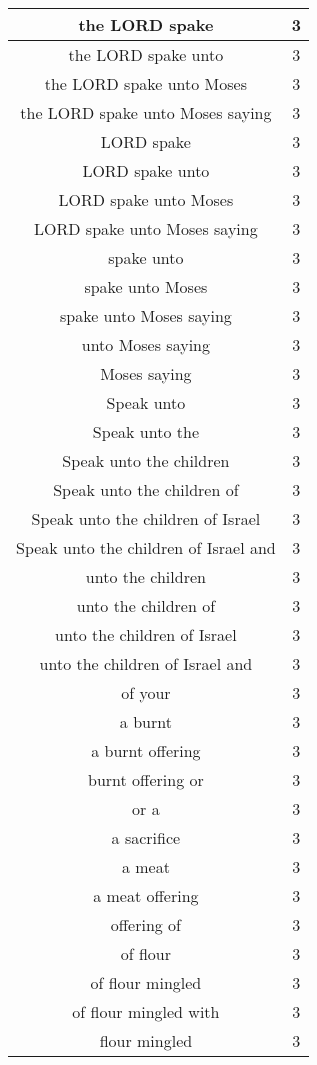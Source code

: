\begin{center}
\begin{longtable}{|c|c|}
the LORD spake & 3\\ \hline 
the LORD spake unto & 3\\ \hline 
the LORD spake unto Moses & 3\\ \hline 
the LORD spake unto Moses saying & 3\\ \hline 
LORD spake & 3\\ \hline 
LORD spake unto & 3\\ \hline 
LORD spake unto Moses & 3\\ \hline 
LORD spake unto Moses saying & 3\\ \hline 
spake unto & 3\\ \hline 
spake unto Moses & 3\\ \hline 
spake unto Moses saying & 3\\ \hline 
unto Moses saying & 3\\ \hline 
Moses saying & 3\\ \hline 
Speak unto & 3\\ \hline 
Speak unto the & 3\\ \hline 
Speak unto the children & 3\\ \hline 
Speak unto the children of & 3\\ \hline 
Speak unto the children of Israel & 3\\ \hline 
Speak unto the children of Israel and & 3\\ \hline 
unto the children & 3\\ \hline 
unto the children of & 3\\ \hline 
unto the children of Israel & 3\\ \hline 
unto the children of Israel and & 3\\ \hline 
of your & 3\\ \hline 
a burnt & 3\\ \hline 
a burnt offering & 3\\ \hline 
burnt offering or & 3\\ \hline 
or a & 3\\ \hline 
a sacrifice & 3\\ \hline 
a meat & 3\\ \hline 
a meat offering & 3\\ \hline 
offering of & 3\\ \hline 
of flour & 3\\ \hline 
of flour mingled & 3\\ \hline 
of flour mingled with & 3\\ \hline 
flour mingled & 3\\ \hline 

\end{longtable}
\end{center}
